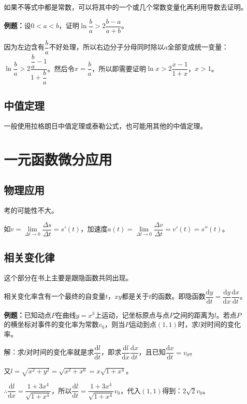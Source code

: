 \documentclass[UTF8, 12pt]{ctexart}
\begin{document}
如果不等式中都是常数，可以将其中的一个或几个常数变量化再利用导数去证明。

\textbf{例题：}设$0<a<b$，证明$\ln\dfrac{b}{a}>2\dfrac{b-a}{a+b}$。

因为左边含有$\dfrac{b}{a}$不好处理，所以右边分子分母同时除以$a$全部变成统一变量：$\ln\dfrac{b}{a}>2\dfrac{\dfrac{b}{a}-1}{1+\dfrac{b}{a}}$。然后令$x=\dfrac{b}{a}$，所以即需要证明$\ln x>2\dfrac{x-1}{1+x}$，$x>1$。

\subsection{中值定理}

一般使用拉格朗日中值定理或泰勒公式，也可能用其他的中值定理。

\section{一元函数微分应用}

\subsection{物理应用}

考的可能性不大。

如$v=\lim\limits_{\Delta t\to0}\dfrac{\Delta s}{\Delta t}=s'(t)$，加速度$a(t)=\lim\limits_{\Delta t\to0}\dfrac{\Delta v}{\Delta t}=v'(t)=s''(t)$。

\subsection{相关变化律}

这个部分在书上主要是跟隐函数共同出现。

相关变化率含有一个最终的自变量$t$，$xy$都是关于$t$的函数。即隐函数$\dfrac{\textrm{d}y}{\textrm{d}t}=\dfrac{\textrm{d}y}{\textrm{d}x}\dfrac{\textrm{d}x}{\textrm{d}t}$。

\textbf{例题：}已知动点$P$在曲线$y=x^3$上运动，记坐标原点与点$P$之间的距离为$l$。若点$P$的横坐标对事件的变化率为常数$v_0$，则当$P$运动到点$(1,1)$时，求$l$对时间的变化率。

解：求$l$对时间的变化率就是求$\dfrac{\textrm{d}l}{\textrm{d}t}$，即求$\dfrac{\textrm{d}l}{\textrm{d}x}\dfrac{\textrm{d}x}{\textrm{d}t}$，且已知$\dfrac{\textrm{d}x}{\textrm{d}t}=v_0$。

又$l=\sqrt{x^2+y^2}=\sqrt{x^2+x^6}=x\sqrt{1+x^4}$。

$\therefore\dfrac{\textrm{d}l}{\textrm{d}x}=\dfrac{1+3x^4}{\sqrt{1+x^4}}$，所以$\dfrac{\textrm{d}l}{\textrm{d}t}=\dfrac{1+3x^4}{\sqrt{1+x^4}}v_0$，代入$(1,1)$得到：$2\sqrt{2}v_0$。
\end{document}
